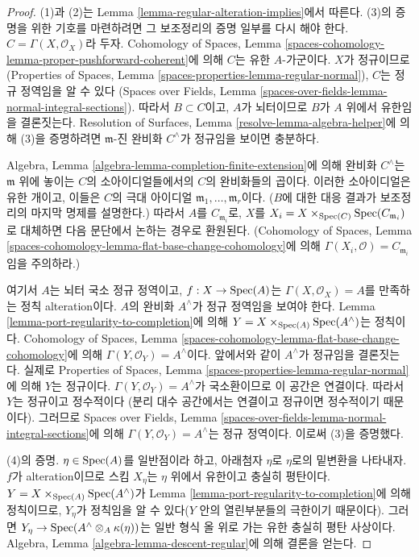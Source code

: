 \begin{proof}
(1)과 (2)는 Lemma \ref{lemma-regular-alteration-implies}에서 따른다.
(3)의 증명을 위한 기호를 마련하려면 그 보조정리의 증명 일부를
다시 해야 한다. $C = \Gamma(X, \mathcal{O}_X)$라 두자.
Cohomology of Spaces, Lemma
\ref{spaces-cohomology-lemma-proper-pushforward-coherent}에 의해
$C$는 유한 $A$-가군이다.
$X$가 정규이므로
(Properties of Spaces, Lemma
\ref{spaces-properties-lemma-regular-normal}),
$C$는 정규 정역임을 알 수 있다
(Spaces over Fields, Lemma
\ref{spaces-over-fields-lemma-normal-integral-sections}).
따라서 $B \subset C$이고, $A$가 뇌터이므로
$B$가 $A$ 위에서 유한임을 결론짓는다.
Resolution of Surfaces, Lemma \ref{resolve-lemma-algebra-helper}에 의해
(3)을 증명하려면 $\mathfrak m$-진 완비화 $C^\wedge$가
정규임을 보이면 충분하다.

\medskip\noindent
Algebra, Lemma \ref{algebra-lemma-completion-finite-extension}에 의해
완비화 $C^\wedge$는 $\mathfrak m$ 위에 놓이는 $C$의
소아이디얼들에서의 $C$의 완비화들의 곱이다.
이러한 소아이디얼은 유한 개이고, 이들은 $C$의 극대 아이디얼
$\mathfrak m_1, \ldots, \mathfrak m_r$이다.
($B$에 대한 대응 결과가 보조정리의 마지막 명제를 설명한다.)
따라서 $A$를 $C_{\mathfrak m_i}$로, $X$를
$X_i = X \times_{\mathop{\mathrm{Spec}}(C)} \mathop{\mathrm{Spec}}(C_{\mathfrak m_i})$로 대체하면
다음 문단에서 논하는 경우로 환원된다.
(Cohomology of Spaces, Lemma
\ref{spaces-cohomology-lemma-flat-base-change-cohomology}에 의해
$\Gamma(X_i, \mathcal{O}) = C_{\mathfrak m_i}$임을 주의하라.)

\medskip\noindent
여기서 $A$는 뇌터 국소 정규 정역이고,
$f : X \to \mathop{\mathrm{Spec}}(A)$는 $\Gamma(X, \mathcal{O}_X) = A$를 만족하는
정칙 alteration이다. $A$의 완비화 $A^\wedge$가
정규 정역임을 보여야 한다. Lemma
\ref{lemma-port-regularity-to-completion}에 의해
$Y = X \times_{\mathop{\mathrm{Spec}}(A)} \mathop{\mathrm{Spec}}(A^\wedge)$는 정칙이다.
Cohomology of Spaces, Lemma
\ref{spaces-cohomology-lemma-flat-base-change-cohomology}에 의해
$\Gamma(Y, \mathcal{O}_Y) = A^\wedge$이다.
앞에서와 같이 $A^\wedge$가 정규임을 결론짓는다.
실제로 Properties of Spaces, Lemma
\ref{spaces-properties-lemma-regular-normal}에 의해 $Y$는 정규이다.
$\Gamma(Y, \mathcal{O}_Y) = A^\wedge$가 국소환이므로 이 공간은 연결이다.
따라서 $Y$는 정규이고 정수적이다
(분리 대수 공간에서는 연결이고 정규이면 정수적이기 때문이다).
그러므로 Spaces over Fields, Lemma
\ref{spaces-over-fields-lemma-normal-integral-sections}에 의해
$\Gamma(Y, \mathcal{O}_Y) = A^\wedge$는 정규 정역이다.
이로써 (3)을 증명했다.

\medskip\noindent
(4)의 증명. $\eta \in \mathop{\mathrm{Spec}}(A)$를 일반점이라 하고,
아래첨자 $\eta$로 $\eta$로의 밑변환을 나타내자.
$f$가 alteration이므로 스킴 $X_\eta$는 $\eta$ 위에서
유한이고 충실히 평탄이다.
$Y = X \times_{\mathop{\mathrm{Spec}}(A)} \mathop{\mathrm{Spec}}(A^\wedge)$가 Lemma
\ref{lemma-port-regularity-to-completion}에 의해 정칙이므로,
$Y_\eta$가 정칙임을 알 수 있다($Y$ 안의 열린부분들의 극한이기 때문이다).
그러면 $Y_\eta \to \mathop{\mathrm{Spec}}(A^\wedge \otimes_A \kappa(\eta))$는
일반 형식 올 위로 가는 유한 충실히 평탄 사상이다.
Algebra, Lemma \ref{algebra-lemma-descent-regular}에 의해 결론을 얻는다.
\end{proof}





